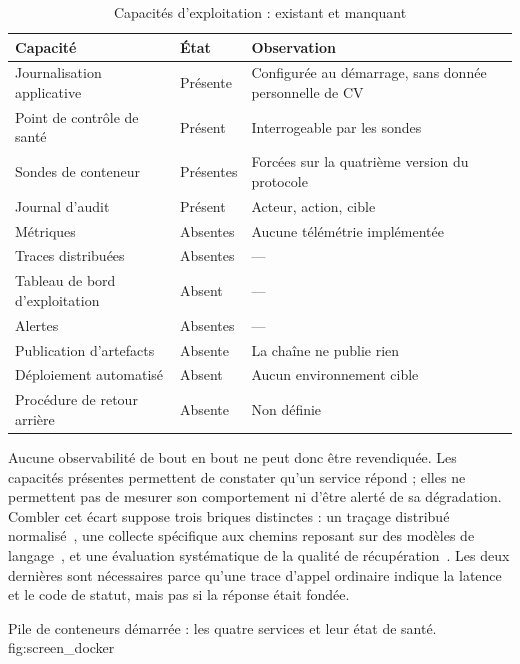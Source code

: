 \begin{table}[htbp]
  \centering
  \caption{Capacités d'exploitation : existant et manquant}
  \label{tab:ops_state}
  \begin{tabularx}{\textwidth}{L{4.0cm} L{2.4cm} X}
    \toprule
    \textbf{Capacité} & \textbf{État} & \textbf{Observation} \\
    \midrule
    Journalisation applicative & Présente & Configurée au démarrage, sans donnée personnelle de CV \\
    Point de contrôle de santé & Présent  & Interrogeable par les sondes \\
    Sondes de conteneur        & Présentes& Forcées sur la quatrième version du protocole \\
    Journal d'audit            & Présent  & Acteur, action, cible \\
    Métriques                  & Absentes & Aucune télémétrie implémentée \\
    Traces distribuées         & Absentes & — \\
    Tableau de bord d'exploitation & Absent & — \\
    Alertes                    & Absentes & — \\
    Publication d'artefacts    & Absente  & La chaîne ne publie rien \\
    Déploiement automatisé     & Absent   & Aucun environnement cible \\
    Procédure de retour arrière& Absente  & Non définie \\
    \bottomrule
  \end{tabularx}
\end{table}

Aucune observabilité de bout en bout ne peut donc être revendiquée. Les
capacités présentes permettent de constater qu'un service répond ; elles ne
permettent pas de mesurer son comportement ni d'être alerté de sa dégradation.
Combler cet écart suppose trois briques distinctes : un traçage distribué
normalisé~\cite{opentelemetry}, une collecte spécifique aux chemins reposant
sur des modèles de langage~\cite{langfuse}, et une évaluation systématique de
la qualité de récupération~\cite{es2024ragas}. Les deux dernières sont
nécessaires parce qu'une trace d'appel ordinaire indique la latence et le code
de statut, mais pas si la réponse était fondée.

  {Pile de conteneurs démarrée : les quatre services et leur état de santé.}
  {fig:screen_docker}

